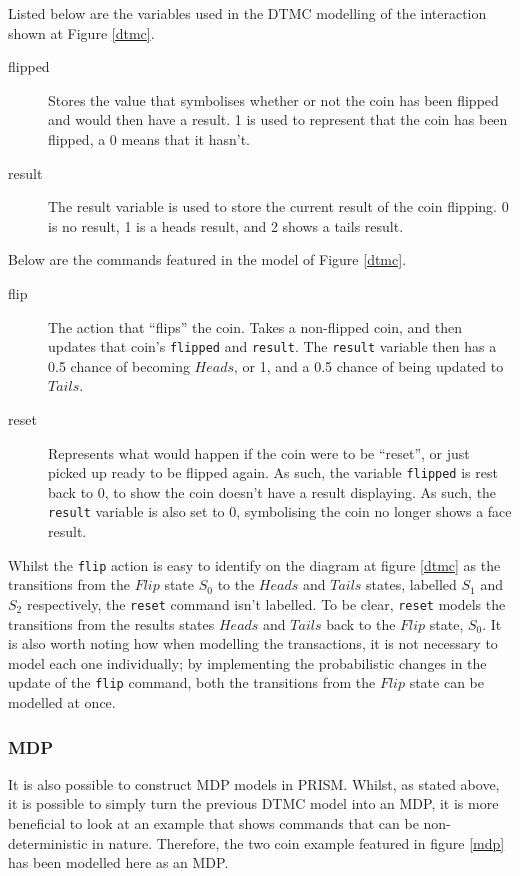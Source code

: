 \documentclass{l4proj}
\begin{document}
Listed below are the variables used in the DTMC modelling of the interaction shown at Figure \ref{dtmc}.
\begin{description}
\item[flipped] Stores the value that symbolises whether or not the coin has been flipped and would then have a result. 1 is used to represent that the coin has been flipped, a 0 means that it hasn't.
\item[result] The result variable is used to store the current result of the coin flipping. 0 is no result, 1 is a heads result, and 2 shows a tails result.
\end{description}

Below are the commands featured in the model of Figure \ref{dtmc}.

\begin{description}
\item[flip] The action that ``flips'' the coin. Takes a non-flipped coin, and then updates that coin's {\tt flipped} and {\tt result}. The {\tt result} variable then has a 0.5 chance of becoming $Heads$, or 1, and a 0.5 chance of being updated to $Tails$.
\item[reset] Represents what would happen if the coin were to be ``reset'', or just picked up ready to be flipped again. As such, the variable {\tt flipped} is rest back to 0, to show the coin doesn't have a result displaying. As such, the {\tt result} variable is also set to 0, symbolising the coin no longer shows a face result.
\end{description}

Whilst the {\tt flip} action is easy to identify on the diagram at figure \ref{dtmc} as the transitions from the $Flip$ state $S_0$ to the $Heads$ and $Tails$ states, labelled $S_1$ and $S_2$ respectively, the {\tt reset} command isn't labelled. To be clear, {\tt reset} models the transitions from the results states $Heads$ and $Tails$ back to the $Flip$ state, $S_0$. It is also worth noting how when modelling the transactions, it is not necessary to model each one individually; by implementing the probabilistic changes in the update of the {\tt flip} command, both the transitions from the $Flip$ state can be modelled at once. 

\subsubsection{MDP}

It is also possible to construct MDP models in PRISM. Whilst, as stated above, it is possible to simply turn the previous DTMC model into an MDP, it is more beneficial to look at an example that shows commands that can be non-deterministic in nature. Therefore, the two coin example featured in figure \ref{mdp} has been modelled here as an MDP.
\end{document}
